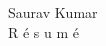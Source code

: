 \documentclass[11pt]{article}
\begin{document}
\begin{center}
\fontsize{30pt}{18pt}
\selectfont Saurav 
\selectfont Kumar\\
\fontsize{16pt}{28pt}\selectfont R \'{e} s u m \'{e}
\end{center}
\vspace{1cm}
\end{document}

